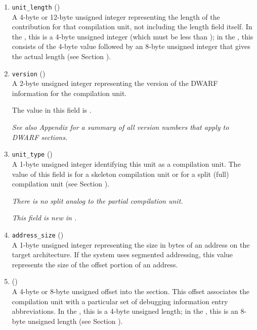 \begin{enumerate}[1. ]

\item \texttt{unit\_length} () \\
A 4-byte or 12-byte 
unsigned integer representing the length
of the \dotdebuginfo{}
contribution for that compilation unit,
not including the length field itself. In the \thirtytwobitdwarfformat,
this is a 4-byte unsigned integer (which must be less
than \xfffffffzero); in the \sixtyfourbitdwarfformat, this consists
of the 4-byte value \wffffffff followed by an 8-byte unsigned
integer that gives the actual length 
(see Section ).

\item  \texttt{version} (\HFTuhalf) \\
A 2-byte unsigned integer representing the version of the
DWARF information for the compilation unit.
 
The value in this field is \versiondotdebuginfo.

\textit{See also Appendix 
for a summary of all version numbers that apply to DWARF sections.}

\item \texttt{unit\_type} (\HFTubyte) \\
A 1-byte unsigned integer identifying this unit as a compilation unit.
The value of this field is 
\DWUTskeleton{} for a skeleton compilation unit or
\DWUTsplitcompile{} for a split 
\bb
(full)
\eb
compilation unit
(see Section ).

\textit{There
\bb
is no split analog to the partial compilation unit.
\eb}

\textit{This field is new in \DWARFVersionV.}

\item \texttt{address\_size} (\HFTubyte) \\
A 1-byte unsigned integer representing the size in bytes of
an address on the target architecture. If the system uses
segmented addressing, this value represents the size of the
offset portion of an address.

\item \HFNdebugabbrevoffset{} () \\
A 
4-byte or 8-byte unsigned offset into the 
\dotdebugabbrev{}
section. This offset associates the compilation unit with a
particular set of debugging information entry abbreviations. In
the \thirtytwobitdwarfformat, this is a 4-byte unsigned length;
in the \sixtyfourbitdwarfformat, this is an 8-byte unsigned length
(see Section ).


\end{enumerate}
